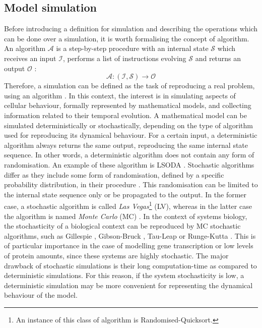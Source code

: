 \subsection{Model simulation}
\label{subsec:Model simulations}
Before introducing a definition for simulation and describing the operations which can be done over a simulation, it is worth formalising the concept of algorithm. An algorithm $\mathcal{A}$ is a step-by-step procedure with an internal state $\mathcal{S}$ which receives an input $\mathcal{I}$, performs a list of instructions evolving $\mathcal{S}$ and returns an output $\mathcal{O}$ \citep{Cormen2009}:
\begin{equation}
  \label{eq:algorithm_definition}
  \mathcal{A}: (\mathcal{I},\mathcal{S}) \longrightarrow \mathcal{O}
\end{equation}
Therefore, a simulation can be defined as the task of reproducing a real problem, using an algorithm \citep{Malesani2004}. In this context, the interest is in simulating aspects of cellular behaviour, formally represented by mathematical models, and collecting information related to their temporal evolution. A mathematical model can be simulated deterministically or stochastically, depending on the type of algorithm used for reproducing its dynamical behaviour. 
For a certain input, a deterministic algorithm always returns the same output, reproducing the same internal state sequence. In other words, a deterministic algorithm does not contain any form of randomisation. An example of these algorithm is LSODA \citep{Hindmarsh1983, Petzold1983}. Stochastic algorithms differ as they include some form of randomisation, defined by a specific probability distribution, in their procedure \citep{Wilkinson2006}. This randomisation can be limited to the internal state sequence only or be propagated to the output. In the former case, a stochastic algorithm is called \emph{Las Vegas}\footnote{An instance of this class of algorithm is Randomised-Quicksort.} (LV), whereas in the latter case the algorithm is named \emph{Monte Carlo} (MC) \citep{Motwani1995, Cormen2009}. In the context of systems biology, the stochasticity of a biological context can be reproduced by MC stochastic algorithms, such as Gillespie \citep{Gillespie1976}, Gibson-Bruck \citep{Gibson2000}, Tau-Leap \citep{
Rathinam2003} or Runge-Kutta \citep{Kloeden1999}. This is of particular importance in the case of modelling gene transcription or low levels of protein amounts, since these systems are highly stochastic. The major drawback of stochastic simulations is their long computation-time as compared to deterministic simulations. For this reason, if the system stochasticity is low, a deterministic simulation may be more convenient for representing the dynamical behaviour of the model.

